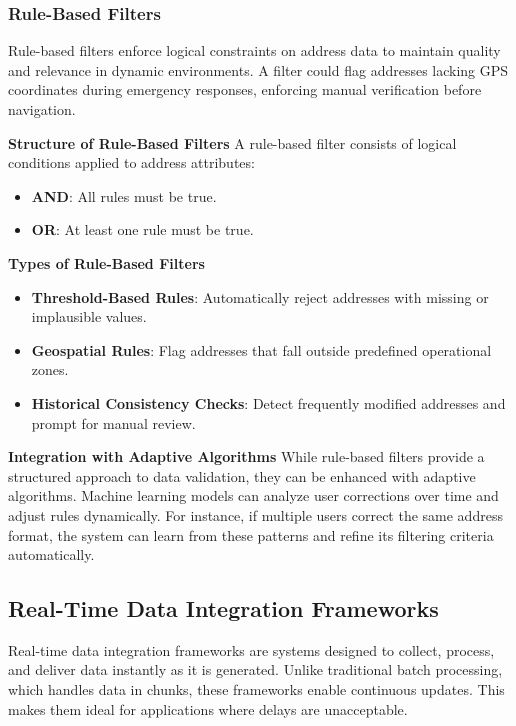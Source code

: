         
        \subsubsection{Rule-Based Filters}
        \label{sssec:rule-based-filters}
        
        Rule-based filters enforce logical constraints on address data to maintain quality and relevance in dynamic environments. A filter could flag addresses lacking GPS coordinates during emergency responses, enforcing manual verification before navigation.\blankLine
        
        
        \textbf{Structure of Rule-Based Filters}\newline
        A rule-based filter consists of logical conditions applied to address attributes:
        \begin{itemize}
            \item \textbf{AND}: All rules must be true.
            \item \textbf{OR}: At least one rule must be true.
        \end{itemize}
        

        \textbf{Types of Rule-Based Filters}
        \begin{itemize}
            \item \textbf{Threshold-Based Rules}: Automatically reject addresses with missing or implausible values.
            \item \textbf{Geospatial Rules}: Flag addresses that fall outside predefined operational zones.
            \item \textbf{Historical Consistency Checks}: Detect frequently modified addresses and prompt for manual review.
        \end{itemize}
        
        \textbf{Integration with Adaptive Algorithms}\newline
        While rule-based filters provide a structured approach to data validation, they can be enhanced with adaptive algorithms. Machine learning models can analyze user corrections over time and adjust rules dynamically. For instance, if multiple users correct the same address format, the system can learn from these patterns and refine its filtering criteria automatically. \autocite{helpAutodesk2025Jan}
        

    \subsection{Real-Time Data Integration Frameworks}
    Real-time data integration frameworks are systems designed to collect, process, and deliver data instantly as it is generated. Unlike traditional batch processing, which handles data in chunks, these frameworks enable continuous updates. This makes them ideal for applications where delays are unacceptable.

